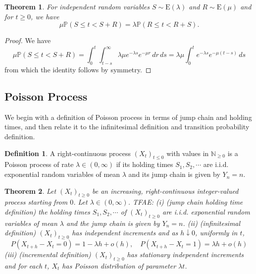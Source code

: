 \documentclass{article}
\newtheorem{Thm}{Theorem}[section]
\theoremstyle{definition}
\newtheorem{Def}{Definition}[section]
\newcommand{\PP}{\mathbb{P}}
\renewcommand{\leq}{\leqslant}
\renewcommand{\geq}{\geqslant}
\newcommand{\<}{\left\langle}
\renewcommand{\>}{\right\rangle}
\begin{document}
\begin{Thm}
    For independent random variables \(S \sim \text{E}(\lambda)\) and \(R \sim \text{E}(\mu)\) and for \(t \geq 0\), we have
\[
\mu \PP(S \leq t < S + R) = \lambda \PP(R \leq t < R + S).
\]
\end{Thm}
\begin{proof}
    We have
    \[
    \mu \PP(S \leq t < S + R) = \int_{0}^{t} \int_{t-s}^{\infty} \lambda\mu e^{-\lambda s} e^{-\mu r} \, dr \, ds = \lambda\mu \int_{0}^{t} e^{-\lambda s} e^{-\mu(t-s)} \, ds
    \]
    from which the identity follows by symmetry.
    
\end{proof}
\subsection{Poisson Process}

We begin with a definition of Poisson process in terms of jump chain and holding times, and then relate it to
the infinitesimal definition and transition probability definition.
\begin{Def}
    A right-continuous process $(X_t)_{t\leq 0}$ with values in $\mathbb{N}_{\geq 0}$ is a Poisson process of rate $\lambda\in (0,\infty)$
    if its holding times $S_1,S_2,\cdots$ are i.i.d. exponential random variables of mean $\lambda$ and its jump chain is given by $Y_n=n$.
\end{Def}

\begin{Thm}
    Let $(X_t)_{t\geq 0}$ be an increasing, right-continuous integer-valued process starting from $0$. Let $\lambda\in(0,\infty)$. TFAE:\newline 
    (i) (jump chain holding time definition) the holding times $S_1,S_2,\cdots$ of $(X_t)_{t\geq 0}$ are i.i.d. exponential random variables of mean $\lambda$ 
    and the jump chain is given by $Y_n=n$.\newline 
    (ii) (infinitesimal definition) $(X_t)_{t\geq 0}$ has independent increments and as $h\downarrow 0$, uniformly in $t$,
    \[P(X_{t+h}-X_t=0)=1-\lambda h+o(h),\quad P(X_{t+h}-X_t=1)=\lambda h+o(h)\]\newline 
    (iii) (incremental definition) $(X_t)_{t\geq 0}$ has stationary independent increments and for each $t$, $X_t$ has Poisson distribution of parameter $\lambda t$.
\end{Thm}
\end{document}
